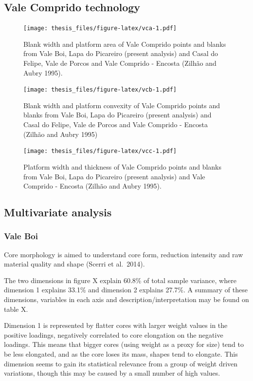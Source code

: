 \documentclass[12pt,twoside]{reedthesis}
\begin{document}
\hypertarget{vale-comprido-technology}{%
\subsection{Vale Comprido technology}\label{vale-comprido-technology}}
\begin{figure}
\centering
\texttt{[image: thesis\_files/figure-latex/vca-1.pdf]}
\caption{\label{fig:vca}Blank width and platform area of Vale Comprido points and blanks from Vale Boi, Lapa do Picareiro (present analysis) and Casal do Felipe, Vale de Porcos and Vale Comprido - Encosta (Zilhão and Aubry 1995).}
\end{figure}
\begin{figure}
\centering
\texttt{[image: thesis\_files/figure-latex/vcb-1.pdf]}
\caption{\label{fig:vcb}Blank width and platform convexity of Vale Comprido points and blanks from Vale Boi, Lapa do Picareiro (present analysis) and Casal do Felipe, Vale de Porcos and Vale Comprido - Encosta (Zilhão and Aubry 1995)}
\end{figure}
\begin{figure}
\centering
\texttt{[image: thesis\_files/figure-latex/vcc-1.pdf]}
\caption{\label{fig:vcc}Platform width and thickness of Vale Comprido points and blanks from Vale Boi, Lapa do Picareiro (present analysis) and Vale Comprido - Encosta (Zilhão and Aubry 1995).}
\end{figure}
\hypertarget{multivariate-analysis}{%
\subsection{Multivariate analysis}\label{multivariate-analysis}}

\hypertarget{vale-boi-8}{%
\subsubsection{Vale Boi}\label{vale-boi-8}}

Core morphology is aimed to understand core form, reduction intensity and raw material quality and shape (Scerri et al.~2014).

The two dimensions in figure X explain 60.8\% of total sample variance, where dimension 1 explains 33.1\% and dimension 2 explains 27.7\%. A summary of these dimensions, variables in each axis and description/interpretation may be found on table X.

Dimension 1 is represented by flatter cores with larger weight values in the positive loadings, negatively correlated to core elongation on the negative loadings. This means that bigger cores (using weight as a proxy for size) tend to be less elongated, and as the core loses its mass, shapes tend to elongate. This dimension seems to gain its statistical relevance from a group of weight driven variations, though this may be caused by a small number of high values.
\end{document}
